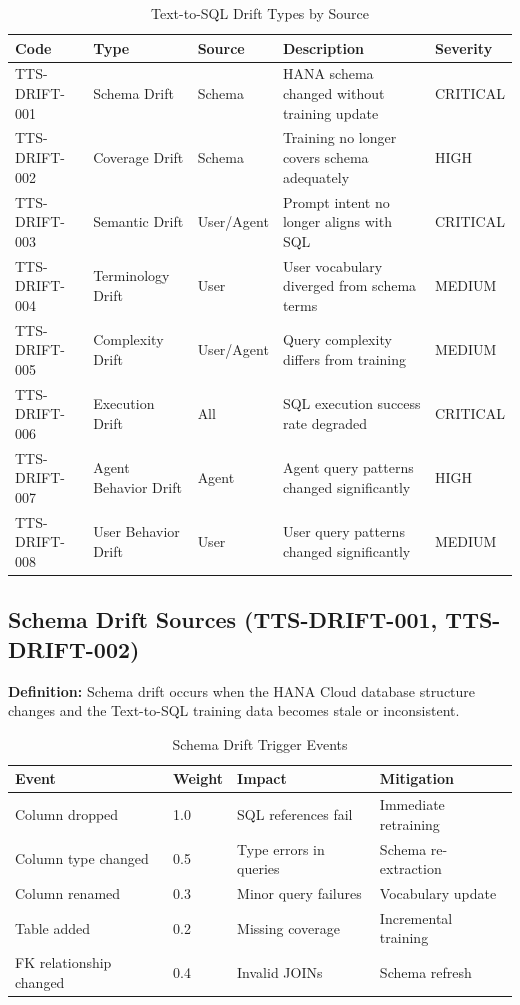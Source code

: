 \begin{table}[htbp]
\centering
\footnotesize
\caption{Text-to-SQL Drift Types by Source}
\label{tab:tts-drift-types}
\begin{tabularx}{\textwidth}{@{}l l l X l@{}}
\toprule
\textbf{Code} & \textbf{Type} & \textbf{Source} & \textbf{Description} & \textbf{Severity} \\
\midrule
TTS-DRIFT-001 & Schema Drift & Schema & HANA schema changed without training update & CRITICAL \\
TTS-DRIFT-002 & Coverage Drift & Schema & Training no longer covers schema adequately & HIGH \\
TTS-DRIFT-003 & Semantic Drift & User/Agent & Prompt intent no longer aligns with SQL & CRITICAL \\
TTS-DRIFT-004 & Terminology Drift & User & User vocabulary diverged from schema terms & MEDIUM \\
TTS-DRIFT-005 & Complexity Drift & User/Agent & Query complexity differs from training & MEDIUM \\
TTS-DRIFT-006 & Execution Drift & All & SQL execution success rate degraded & CRITICAL \\
TTS-DRIFT-007 & Agent Behavior Drift & Agent & Agent query patterns changed significantly & HIGH \\
TTS-DRIFT-008 & User Behavior Drift & User & User query patterns changed significantly & MEDIUM \\
\bottomrule
\end{tabularx}
\end{table}

\subsection{Schema Drift Sources (TTS-DRIFT-001, TTS-DRIFT-002)}

\textbf{Definition:} Schema drift occurs when the HANA Cloud database structure
changes and the Text-to-SQL training data becomes stale or inconsistent.

\begin{table}[htbp]
\centering
\footnotesize
\caption{Schema Drift Trigger Events}
\label{tab:schema-drift-triggers}
\begin{tabularx}{\textwidth}{@{}l l l X@{}}
\toprule
\textbf{Event} & \textbf{Weight} & \textbf{Impact} & \textbf{Mitigation} \\
\midrule
Column dropped & 1.0 & SQL references fail & Immediate retraining \\
Column type changed & 0.5 & Type errors in queries & Schema re-extraction \\
Column renamed & 0.3 & Minor query failures & Vocabulary update \\
Table added & 0.2 & Missing coverage & Incremental training \\
FK relationship changed & 0.4 & Invalid JOINs & Schema refresh \\
\bottomrule
\end{tabularx}
\end{table}

